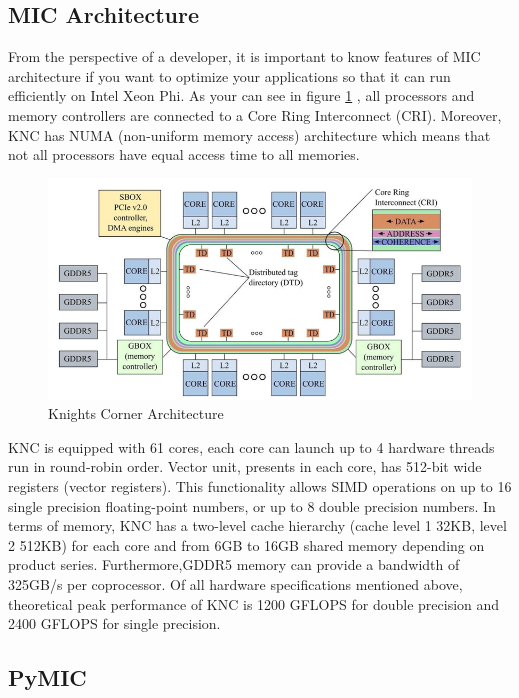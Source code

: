 \subsection{MIC Architecture}

From the perspective of a developer, it is important to know features of MIC architecture if you want to optimize your applications so that it can run efficiently on Intel Xeon Phi. As your can see in figure \ref{fig:arch} \cite{phibook}, all processors and memory controllers are connected to a Core Ring Interconnect (CRI). Moreover, KNC has NUMA (non-uniform memory access) architecture which means that not all processors have equal access time to all memories.

\begin{figure}[h]
\centering
\includegraphics[scale=0.45]{img/mic-arch.png}
\caption{Knights Corner Architecture}
\label{fig:arch}
\end{figure}

KNC is equipped with 61 cores, each core can launch up to 4 hardware threads run in round-robin order. Vector unit, presents in each core, has 512-bit wide registers (vector registers). This functionality allows SIMD operations on up to 16 single precision floating-point numbers, or up to 8 double precision numbers. In terms of memory, KNC has a two-level cache hierarchy (cache level 1 32KB, level 2 512KB) for each core and from 6GB to 16GB shared memory depending on product series. Furthermore,GDDR5 memory can provide a bandwidth of 325GB/s per coprocessor. Of all hardware specifications mentioned above, theoretical peak performance of KNC is 1200 GFLOPS for double precision and 2400 GFLOPS for single precision.

\subsection{PyMIC}

